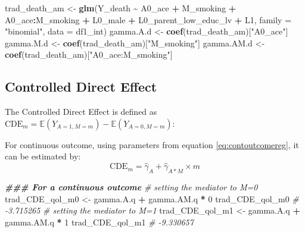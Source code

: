 \documentclass[
]{book}
\newenvironment{Shaded}{\begin{snugshade}}{\end{snugshade}}
\newcommand{\AttributeTok}[1]{\textcolor[rgb]{0.13,0.29,0.53}{#1}}
\newcommand{\CommentTok}[1]{\textcolor[rgb]{0.56,0.35,0.01}{\textit{#1}}}
\newcommand{\DecValTok}[1]{\textcolor[rgb]{0.00,0.00,0.81}{#1}}
\newcommand{\DocumentationTok}[1]{\textcolor[rgb]{0.56,0.35,0.01}{\textbf{\textit{#1}}}}
\newcommand{\FunctionTok}[1]{\textcolor[rgb]{0.13,0.29,0.53}{\textbf{#1}}}
\newcommand{\NormalTok}[1]{#1}
\newcommand{\OtherTok}[1]{\textcolor[rgb]{0.56,0.35,0.01}{#1}}
\newcommand{\SpecialCharTok}[1]{\textcolor[rgb]{0.81,0.36,0.00}{\textbf{#1}}}
\newcommand{\StringTok}[1]{\textcolor[rgb]{0.31,0.60,0.02}{#1}}
\begin{document}
\begin{Shaded}
\begin{Highlighting}[]
\NormalTok{trad\_death\_am }\OtherTok{\textless{}{-}} \FunctionTok{glm}\NormalTok{(Y\_death }\SpecialCharTok{\textasciitilde{}}\NormalTok{ A0\_ace }\SpecialCharTok{+}\NormalTok{ M\_smoking }\SpecialCharTok{+}\NormalTok{ A0\_ace}\SpecialCharTok{:}\NormalTok{M\_smoking }\SpecialCharTok{+}
\NormalTok{                       L0\_male }\SpecialCharTok{+}\NormalTok{ L0\_parent\_low\_educ\_lv }\SpecialCharTok{+}\NormalTok{ L1,}
                     \AttributeTok{family =} \StringTok{"binomial"}\NormalTok{,}
                     \AttributeTok{data =}\NormalTok{ df1\_int)}
\NormalTok{gamma.A.d }\OtherTok{\textless{}{-}} \FunctionTok{coef}\NormalTok{(trad\_death\_am)[}\StringTok{"A0\_ace"}\NormalTok{]}
\NormalTok{gamma.M.d }\OtherTok{\textless{}{-}} \FunctionTok{coef}\NormalTok{(trad\_death\_am)[}\StringTok{"M\_smoking"}\NormalTok{]}
\NormalTok{gamma.AM.d }\OtherTok{\textless{}{-}} \FunctionTok{coef}\NormalTok{(trad\_death\_am)[}\StringTok{"A0\_ace:M\_smoking"}\NormalTok{]}
\end{Highlighting}
\end{Shaded}

\hypertarget{trad2waycde}{%
\subsection{Controlled Direct Effect}\label{trad2waycde}}

The Controlled Direct Effect is defined as \(\text{CDE}_m = \mathbb{E}(Y_{A=1,M=m}) - \mathbb{E}(Y_{A=0,M=m})\):

For continuous outcome, using parameters from equation \eqref{eq:contoutcomereg}, it can be estimated by:
\[\text{CDE}_m = \hat{\gamma}_A + \hat{\gamma}_{A \ast M} \times m\]

\begin{Shaded}
\begin{Highlighting}[]
\DocumentationTok{\#\#\# For a continuous outcome}
\CommentTok{\# setting the mediator to M=0}
\NormalTok{trad\_CDE\_qol\_m0 }\OtherTok{\textless{}{-}}\NormalTok{ gamma.A.q }\SpecialCharTok{+}\NormalTok{ gamma.AM.q }\SpecialCharTok{*} \DecValTok{0}
\NormalTok{trad\_CDE\_qol\_m0}
\CommentTok{\# {-}3.715265}
\CommentTok{\# setting the mediator to M=1}
\NormalTok{trad\_CDE\_qol\_m1 }\OtherTok{\textless{}{-}}\NormalTok{ gamma.A.q }\SpecialCharTok{+}\NormalTok{ gamma.AM.q }\SpecialCharTok{*} \DecValTok{1}
\NormalTok{trad\_CDE\_qol\_m1}
\CommentTok{\# {-}9.330657}
\end{Highlighting}
\end{Shaded}
\end{document}
